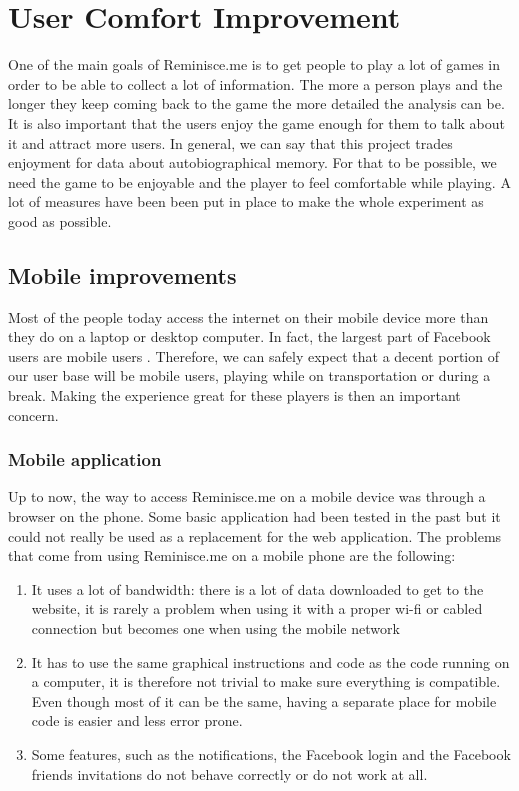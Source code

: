 \chapter{User Comfort Improvement}
One of the main goals of Reminisce.me is to get people to play a lot of games in order to be able to collect a lot of information. The more a person plays and the longer they keep coming back to the game the more detailed the analysis can be. It is also important that the users enjoy the game enough for them to talk about it and attract more users. In general, we can say that this project trades enjoyment for data about autobiographical memory. For that to be possible, we need the game to be enjoyable and the player to feel comfortable while playing. A lot of measures have been been put in place to make the whole experiment as good as possible.
\section{Mobile improvements}
Most of the people today access the internet on their mobile device more than they do on a laptop or desktop computer. In fact, the largest part of Facebook users are mobile users \cite{mobileusage}. Therefore, we can safely expect that a decent portion of our user base will be mobile users, playing while on transportation or during a break. Making the experience great for these players is then an important concern.
\subsection{Mobile application}
Up to now, the way to access Reminisce.me on a mobile device was through a browser on the phone. Some basic application had been tested in the past but it could not really be used as a replacement for the web application. The problems that come from using Reminisce.me on a mobile phone are the following:
\begin{enumerate}
	\item It uses a lot of bandwidth: there is a lot of data downloaded to get to the website, it is rarely a problem when using it with a proper wi-fi or cabled connection but becomes one when using the mobile network
	\item It has to use the same graphical instructions and code as the code running on a computer, it is therefore not trivial to make sure everything is compatible. Even though most of it can be the same, having a separate place for mobile code is easier and less error prone.
	\item Some features, such as the notifications, the Facebook login and the Facebook friends invitations do not behave correctly or do not work at all.
\end{enumerate}

